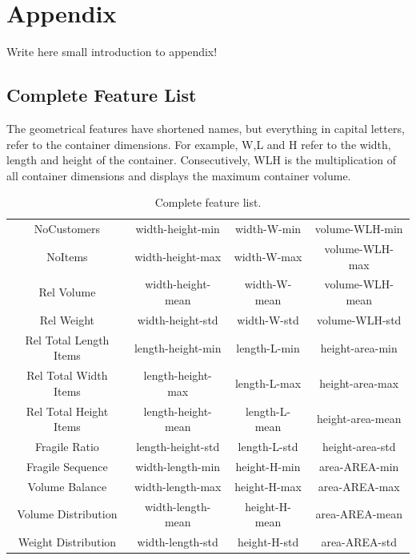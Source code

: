 \appendix
\chapter{Appendix}

Write here small introduction to appendix! %
\clearpage
\section{Complete Feature List}

The geometrical features have shortened names, but everything in capital letters, refer to the container
dimensions. For example, W,L and H refer to the width, length and height of the container. Consecutively,
WLH is the multiplication of all container dimensions and displays the maximum container volume.

\begin{table}[ht]
	\centering
	\small
	\renewcommand{\arraystretch}{1.3}
	\begin{tabular}{@{}cccc@{}}
		NoCustomers            & width-height-min   & width-W-min   & volume-WLH-min   \\
		NoItems                & width-height-max   & width-W-max   & volume-WLH-max   \\
		Rel Volume             & width-height-mean  & width-W-mean  & volume-WLH-mean  \\
		Rel Weight             & width-height-std   & width-W-std   & volume-WLH-std   \\
		Rel Total Length Items & length-height-min  & length-L-min  & height-area-min  \\
		Rel Total Width Items  & length-height-max  & length-L-max  & height-area-max  \\
		Rel Total Height Items & length-height-mean & length-L-mean & height-area-mean \\
		Fragile Ratio          & length-height-std  & length-L-std  & height-area-std  \\
		Fragile Sequence       & width-length-min   & height-H-min  & area-AREA-min    \\
		Volume Balance         & width-length-max   & height-H-max  & area-AREA-max    \\
		Volume Distribution    & width-length-mean  & height-H-mean & area-AREA-mean   \\
		Weight Distribution    & width-length-std   & height-H-std  & area-AREA-std    \\
	\end{tabular}
	\caption{Complete feature list.}
	\label{tab:complete_features_list}
\end{table}

